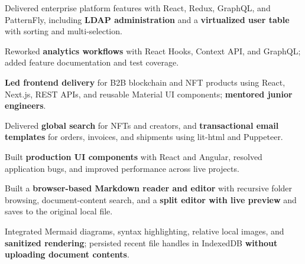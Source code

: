 \begin{resumebullets}
  \item Delivered enterprise platform features with React, Redux, GraphQL, and PatternFly, including \textbf{LDAP administration} and a \textbf{virtualized user table} with sorting and multi-selection.
  \item Reworked \textbf{analytics workflows} with React Hooks, Context API, and GraphQL; added feature documentation and test coverage.
\end{resumebullets}

\begin{resumebullets}
  \item \textbf{Led frontend delivery} for B2B blockchain and NFT products using React, Next.js, REST APIs, and reusable Material UI components; \textbf{mentored junior engineers}.
  \item Delivered \textbf{global search} for NFTs and creators, and \textbf{transactional email templates} for orders, invoices, and shipments using lit-html and Puppeteer.
\end{resumebullets}

\begin{resumebullets}
  \item Built \textbf{production UI components} with React and Angular, resolved application bugs, and improved performance across live projects.
\end{resumebullets}

\newpage
{\hfill{}\par}
\vspace{3mm}

\begin{resumebullets}
  \item Built a \textbf{browser-based Markdown reader and editor} with recursive folder browsing, document-content search, and a \textbf{split editor with live preview} and saves to the original local file.
  \item Integrated Mermaid diagrams, syntax highlighting, relative local images, and \textbf{sanitized rendering}; persisted recent file handles in IndexedDB \textbf{without uploading document contents}.
\end{resumebullets}


